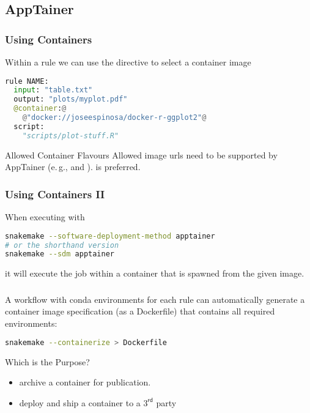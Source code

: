 \subsection{AppTainer}

\begin{frame}[fragile]
  \frametitle{Using Containers}
  Within a rule we can use the  directive to select a container image
  \begin{lstlisting}[language=Python,style=Python]
rule NAME:
  input: "table.txt"
  output: "plots/myplot.pdf"
  @container:@
    @"docker://joseespinosa/docker-r-ggplot2"@
  script:
    "scripts/plot-stuff.R"
  \end{lstlisting}
  \begin{docs}{Allowed Container Flavours}
  	Allowed image urls need to be supported by AppTainer (e.\,g.,  and ).  is preferred.
  \end{docs}	
\end{frame}

\begin{frame}[fragile]
  \frametitle{Using Containers II}
  When executing \Snakemake{} with
  \begin{lstlisting}[language=Bash, style=Shell]
snakemake --software-deployment-method apptainer
# or the shorthand version
snakemake --sdm apptainer
  \end{lstlisting}
   it will execute the job within a container that is spawned from the given image.
\end{frame}

\begin{frame}[fragile]
  \frametitle{}
  A \Snakemake{} workflow with conda environments for each rule can automatically generate a container image specification (as a Dockerfile) that contains all required environments:
  \begin{lstlisting}[language=Bash, style=Shell]
snakemake --containerize > Dockerfile
  \end{lstlisting}
  \begin{question}{Which is the Purpose?}
  	\begin{itemize}
  	  \item archive a container for publication.
  	  \item deploy and ship a container to a $3^{\mathsf{rd}}$ party
  	\end{itemize}
  \end{question}
\end{frame}

